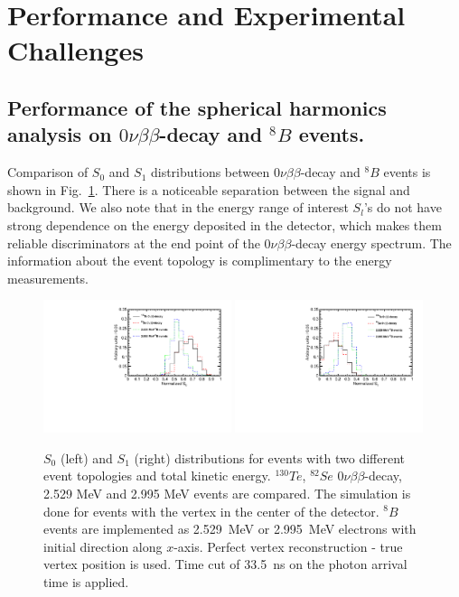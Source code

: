 \documentclass[12pt,twoside,letterpaper]{article}
\newcommand{\vbb}{0\nu\beta\beta}
\newcommand{\B}{^{8}B}
\begin{document}
\section{Performance and Experimental Challenges}
\label{sec:performance_and_challenges}

\subsection{Performance of the spherical harmonics analysis on $\vbb$-decay and $\B$ events.}

Comparison of $S_0$ and $S_1$ distributions between $\vbb$-decay and $\B$ events is shown in Fig.~\ref{fig:S_vs_energy}. There is a noticeable separation between the signal and background. We also note that in the energy range of interest $S_l$'s do not have strong dependence on the energy deposited in the detector, which makes them reliable discriminators at the end point of the $\vbb$-decay energy spectrum. The information about the event topology is complimentary to the energy measurements.

\begin{figure}[htb]
\centering
\includegraphics[angle=0,width=0.49\textwidth]{plots/hS0.pdf}
\includegraphics[angle=0,width=0.49\textwidth]{plots/hS1.pdf}
\caption{$S_0$ (left) and $S_1$ (right) distributions for events with two different event topologies and total kinetic energy. $^{130}Te$, $^{82}Se$ $\vbb$-decay, 2.529 MeV and 2.995 MeV events are compared. The simulation is done for events with the vertex in the center of the detector. $\B$ events are implemented as 2.529~MeV or 2.995~MeV electrons with initial direction along $x$-axis. Perfect vertex reconstruction - true vertex position is used. Time cut of 33.5~ns on the photon arrival time is applied.}
\label{fig:S_vs_energy}
\end{figure}
\end{document}

